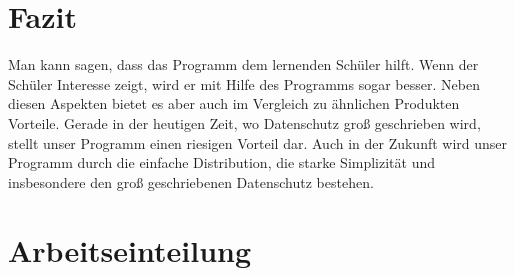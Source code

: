 \documentclass[a4paper, 11pt, titlepage]{article}
\begin{document}
\section{Fazit}

Man kann sagen, dass das Programm dem lernenden Schüler hilft. Wenn der Schüler Interesse zeigt, wird er mit Hilfe des Programms sogar besser. Neben diesen Aspekten bietet es aber auch im Vergleich zu ähnlichen Produkten Vorteile. Gerade in der heutigen Zeit, wo Datenschutz groß geschrieben wird, stellt unser Programm einen riesigen Vorteil dar. Auch in der Zukunft wird unser Programm durch die einfache Distribution, die starke Simplizität und insbesondere den groß geschriebenen Datenschutz bestehen.


\section{Arbeitseinteilung}
\end{document}

